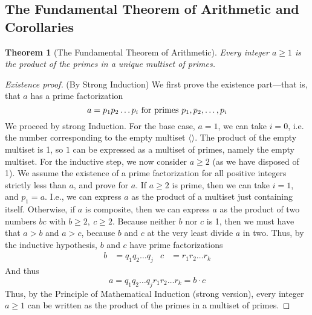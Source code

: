 \documentclass[10pt]{article}
\newtheorem{theorem}{Theorem}[section]
\theoremstyle{definition}
\begin{document}
\subsection{The Fundamental Theorem of Arithmetic and Corollaries}
\begin{theorem}[The Fundamental Theorem of Arithmetic]
Every integer $a\geq 1$ is the product of the primes in a unique multiset of primes.
\end{theorem}
\begin{proof}[Existence proof](By Strong Induction) We first prove the existence part---that is, that $a$ has a prime factorization
\[ 
a = p_1 p_2\ldots p_i \textnormal{~for primes $p_1,p_2,\ldots,p_i$}
\]
We proceed by strong Induction.  For the base case, $a=1$, we can take $i=0$, i.e. the number corresponding to the empty multiset $\langle \rangle$.  The product of the empty multiset is 1, so $1$ can be expressed as a multiset of primes, namely the empty multiset.  For the inductive step, we now consider $a\geq 2$ (as we have disposed of 1).  We assume the existence of a prime factorization for all positive integers strictly less than $a$, and prove for $a$.  If $a\geq 2$ is prime, then we can take $i=1$, and $p_1=a$.  I.e., we can express $a$ as the product of a multiset just containing itself.  Otherwise, if $a$ is composite, then we can express $a$ as the product of two numbers $bc$ with $b\geq 2,~c\geq 2$.  Because neither $b$ nor $c$ is 1, then we must have that $a>b$ and $a>c$, because $b$ and $c$ at the very least divide $a$ in two.  Thus, by the inductive hypothesis, $b$ and $c$ have prime factorizations 
\begin{align*}
b &= q_1 q_2\ldots q_j & c &= r_1 r_2\ldots r_k
\end{align*}
And thus 
\[a = q_1q_2\ldots q_j r_1 r_2 \ldots r_k = b\cdot c
\]
Thus, by the Principle of Mathematical Induction (strong version), every integer $a\geq 1$ can be written as the product of the primes in a multiset of primes.
\end{proof}~\\
\end{document}
